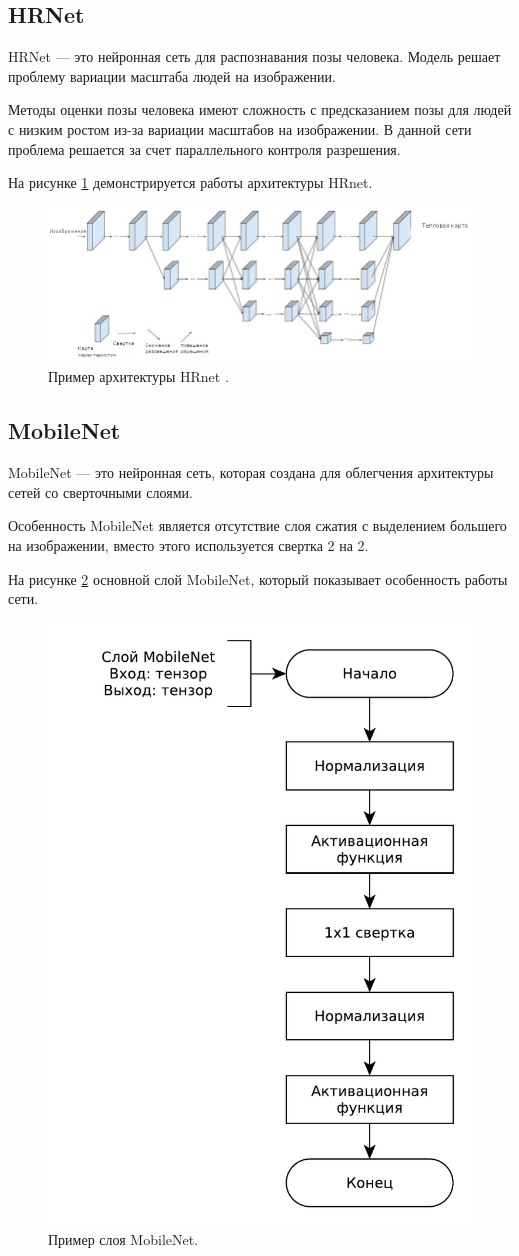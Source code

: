 \subsection{HRNet}

HRNet \cite{Hrenet} --- это нейронная сеть для распознавания позы человека. Модель решает проблему вариации масштаба людей на изображении.

Методы оценки позы человека имеют сложность с предсказанием позы для людей с низким ростом из-за вариации масштабов на изображении. В данной сети проблема решается за счет параллельного контроля разрешения.

На рисунке \ref{fig:hrenet} демонстрируется работы архитектуры HRnet.

\begin{figure}[ht!]
	\centering
	\includegraphics[width=0.9\linewidth]{assets/hrenet.jpeg}
	\caption{Пример архитектуры HRnet \cite{Hrenet}.}
	\label{fig:hrenet}
\end{figure} 

\subsection{MobileNet}

MobileNet \cite{MobileNet} --- это нейронная сеть, которая создана для облегчения архитектуры сетей со сверточными слоями. 

Особенность MobileNet является отсутствие слоя сжатия с выделением большего на изображении, вместо этого используется свертка 2 на 2.

На рисунке \ref{fig:mobilenet} основной слой MobileNet, который показывает особенность работы сети.

\begin{figure}[ht!]
	\centering
	\includegraphics[width=0.4\linewidth]{assets/mobilenet.pdf}
	\caption{Пример слоя MobileNet.}
	\label{fig:mobilenet}
\end{figure} 


